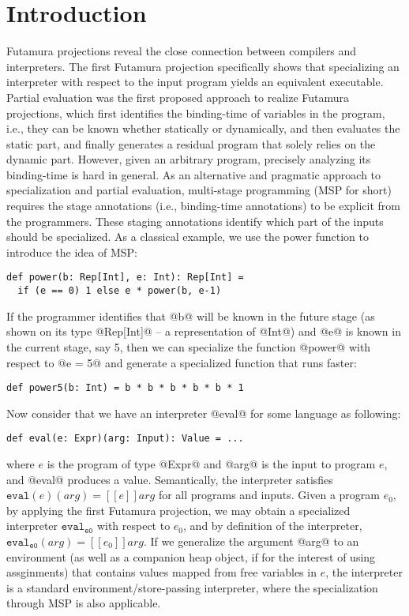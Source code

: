 \section{Introduction}

Futamura projections \cite{Futamura1999, futamura1971partial} reveal the close
connection between compilers and interpreters. The first Futamura projection
specifically shows that specializing an interpreter with respect to the input
program yields an equivalent executable. Partial evaluation
\cite{DBLP:books/daglib/0072559} was the first proposed approach to realize
Futamura projections, which first identifies the binding-time of variables in
the program, i.e., they can be known whether statically or dynamically, and then
evaluates the static part, and finally generates a residual program that solely
relies on the dynamic part. However, given an arbitrary program, precisely
analyzing its binding-time is hard in general. As an alternative and pragmatic
approach to specialization and partial evaluation, multi-stage programming (MSP
for short) \cite{taha1999multi, DBLP:conf/pepm/TahaS97} requires the stage
annotations (i.e., binding-time annotations) to be explicit from the programmers.
These staging annotations identify which part of the inputs should be
specialized. As a classical example, we use the power function to introduce
the idea of MSP:

\begin{lstlisting}
def power(b: Rep[Int], e: Int): Rep[Int] = 
  if (e == 0) 1 else e * power(b, e-1)
\end{lstlisting}

If the programmer identifies that @b@ will be known in the future stage (as shown
on its type @Rep[Int]@ -- a representation of @Int@) and @e@ is known in the
current stage, say 5, then we can specialize the function @power@ with
respect to @e = 5@ and generate a specialized function that runs faster:

\begin{lstlisting}
def power5(b: Int) = b * b * b * b * b * 1
\end{lstlisting}

Now consider that we have an interpreter @eval@ for some language as following:

\begin{lstlisting}
def eval(e: Expr)(arg: Input): Value = ...
\end{lstlisting}

where $e$ is the program of type @Expr@ and @arg@ is the input to program $e$,
and @eval@ produces a value.
Semantically, the interpreter satisfies $ \texttt{eval}(e)(arg) = [\![ e ]\!] arg$ for all
programs and inputs. Given a program $e_0$, by applying the first Futamura
projection, we may obtain a specialized interpreter
$\texttt{eval}_{\texttt{e0}}$ with respect to $e_0$, and by definition of the interpreter, 
$\texttt{eval}_{\texttt{e0}}(arg) = [\![ e_0 ]\!] arg $. If we generalize the
argument @arg@ to an environment (as well as a companion heap object, if for the
interest of using assginments) that contains values mapped from free variables
in $e$, the interpreter is a standard environment/store-passing interpreter,
where the specialization through MSP is also applicable.

